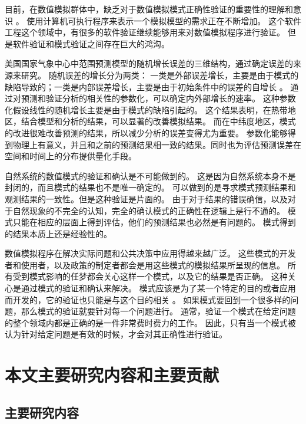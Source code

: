 目前，在数值模拟群体中，缺乏对于数值模拟模式正确性验证的重要性的理解和意识\cite{whitner1989guidelines} 。 
使用计算机可执行程序来表示一个模拟模型的需求正在不断增加。 
这个软件工程这个领域中，有很多的软件验证继续能够用来对数值模拟程序进行验证。
但是软件验证和模式验证之间存在巨大的鸿沟。 


 
美国国家气象中心中范围预测模型的随机增长误差的三维结构，通过确定误差的来源来研究。
随机误差的增长分为两类： 一类是外部误差增长，主要是由于模式的缺陷导致的；一类是内部误差增长，主要是由于初始条件中的误差的自增长\cite{reynolds1994random} 。 
通过对预测和验证分析的相关性的参数化，可以确定内外部增长的速率。
这种参数化假设线性的随机增长主要是由于模式的缺陷引起的。 
这个结果表明，在热带地区，结合模型和分析的结果，可以显著的改善模拟结果。
而在中纬度地区，模式的改进很难改善预测的结果，所以减少分析的误差变得尤为重要。 
参数化能够得到物理上有意义，并且和之前的预测结果相一致的结果。同时也为评估预测误差在空间和时间上的分布提供量化手段。 


自然系统的数值模式的验证和确认是不可能做到的。
这是因为自然系统本身不是封闭的，而且模式的结果也不是唯一确定的\cite{oreskes1994verification}。
可以做到的是寻求模式预测结果和观测结果的一致性。但是这种验证是片面的。
由于对于结果的错误确信，以及对于自然现象的不完全的认知，完全的确认模式的正确性在逻辑上是行不通的。
模式只能在相应的层面上得到评估，他们的预测结果也必然是有问题的。
模式得到的结果本质上还是经验性的。


  
数值模拟程序在解决实际问题和公共决策中应用得越来越广泛。 
这些模式的开发者和使用者，以及政策的制定者都会是用这些模式的模拟结果所呈现的信息。
所有受到模式影响的任梦都会关心这样一个模式，以及它的结果是否正确。
这种关心是通过模式的验证和确认来解决。
模式应该是为了某一个特定的目的或者应用而开发的，它的验证也只能是与这个目的相关\cite{sargent2005verification} 。 
如果模式要回到一个很多样的问题，那么模式的验证就要针对每一个问题进行。
通常，验证一个模式在给定问题的整个领域内都是正确的是一件非常费时费力的工作。 
因此，只有当一个模式被认为针对给定问题是有效的时候，才会对其正确性进行验证。 


\section{本文主要研究内容和主要贡献}
\subsection{主要研究内容}
